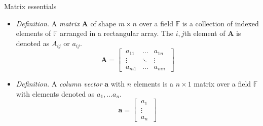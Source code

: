 \documentclass{beamer}
\numberwithin{equation}{section}
\begin{document}
\begin{frame}{Matrix essentials}
    \begin{itemize}
        \item
        \textit{Definition.} A \textit{matrix} $ \mathbf{A} $ of shape
        $ m \times n $ over a field\footnotemark{} $ \mathbb{F} $ is a collection of indexed elements of $ \mathbb{F} $
        arranged in a rectangular array. The $ i, j$th element of
        $ \mathbf{A} $ is denoted as $ A_{ij} $ or $ a_{ij} $.
        \begin{equation*}
            \mathbf{A} = \begin{bmatrix}
                \ a_{11} & \ldots & a_{1n} \ \\
                \ \vdots & \ddots & \vdots \ \\
                \ a_{m1} & \ldots & a_{mn} \
            \end{bmatrix}
        \end{equation*}

        \item
        \textit{Definition.} A \textit{column vector} $ \mathbf{a} $ with
        $ n $ elements is a $ n \times 1 $ matrix over a field $ \mathbb{F} $
        with elements denoted as $ a_1, \ldots a_n $.
        \begin{equation*}
            \mathbf{a} = \begin{bmatrix}
                \ a_1 \ \\ \ \vdots \ \\ \ a_n \
            \end{bmatrix}
        \end{equation*}
    \end{itemize}
\end{frame}
\end{document}
